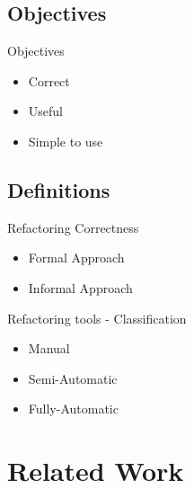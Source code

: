 \documentclass[xcolor=dvipsnames, 14pt]{beamer}
\begin{document}
\subsection{Objectives}

\begin{frame}{Objectives}%
  \begin{itemize}
  \setlength\itemsep{2em}
  \item {
    Correct
  }
  \item {
    Useful
  }
  \item {
    Simple to use
  }
  \end{itemize}
\end{frame}

\subsection{Definitions}
\begin{frame}{Refactoring Correctness}
\begin{itemize}
\setlength\itemsep{2em}
\item Formal Approach
\item Informal Approach
\end{itemize}
\end{frame}
\begin{frame}{Refactoring tools - Classification}
  \begin{itemize}
  \setlength\itemsep{2em}
  \item {
    Manual
  }
  \item {
    Semi-Automatic
  }
  \item {
    Fully-Automatic
  }
  \end{itemize}
\end{frame}
\section{Related Work}
\end{document}
